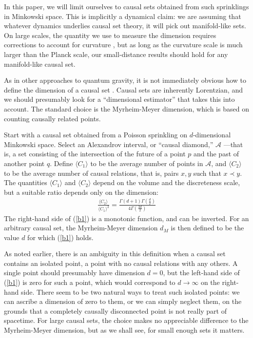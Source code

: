 \documentclass[12pt]{article}
\begin{document}
In this paper, we will limit ourselves to causal sets obtained from such sprinklings in
Minkowski space.  This is implicitly a dynamical claim: we are assuming that whatever
dynamics underlies causal set theory, it will pick out manifold-like sets.  On large
scales, the quantity we use to measure the dimension requires corrections to
account for curvature , but as long as the curvature scale is much larger
than the Planck scale, our small-distance results should hold for any manifold-like
causal set.

As in other approaches to quantum gravity, it is not immediately obvious how to
define the dimension of a causal set .  Causal sets are inherently
Lorentzian, and we should presumably look for a ``dimensional estimator'' that
takes this into account.  The standard choice is the Myrheim-Meyer dimension,
which is based on counting causally related points.

Start with a causal set obtained from a Poisson sprinkling on $d$-dimensional
Minkowski space.  Select an Alexandrov interval, or ``causal diamond,'' $\mathcal{A}$%
---that is, a set consisting of the intersection of the future of a point $p$ and the past
of another point $q$.  Define $\langle C_1\rangle$ to be the average number of
points in $\mathcal{A}$, and $\langle C_2\rangle$ to be the average number of causal
relations, that is, pairs $x,y$ such that $x\prec y$.  The quantities $\langle C_1\rangle$
and $\langle C_2\rangle$ depend on the volume and the discreteness scale, but a
suitable ratio depends only on the dimension:
\begin{align}
\frac{\langle C_2\rangle\,}{\langle C_1\rangle^2} =
   \frac{\Gamma(d+1)\Gamma(\frac{d}{2})}{4\Gamma(\frac{3d}{2})}
\label{b1}
\end{align}
The right-hand side of (\ref{b1}) is a monotonic function, and can be inverted.
For an arbitrary causal set, the Myrheim-Meyer dimension $d_M$ is then defined to
be the value $d$ for which (\ref{b1}) holds.

As noted earlier, there is an ambiguity in this definition when a causal set contains an
isolated point, a point with no causal relations with any others.  A single point should
presumably have dimension $d=0$, but the left-hand side of (\ref{b1}) is zero for
such a point, which would correspond to $d\rightarrow\infty$ on the right-hand
side.  There seem to be two natural ways to treat such isolated points: we can ascribe
a dimension of zero to them, or we can simply neglect them, on the grounds that
a completely causally disconnected point is not really part of spacetime.  For large
causal sets, the choice  makes no appreciable difference to the Myrheim-Meyer
dimension, but as we shall see, for small enough sets it matters.
\end{document}
